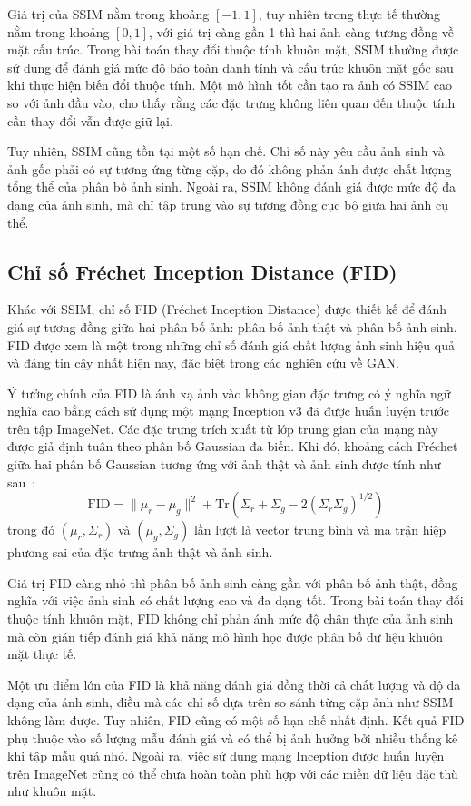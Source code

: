 \documentclass[../DoAn.tex]{subfiles}
\begin{document}
Giá trị của SSIM nằm trong khoảng $[-1, 1]$, tuy nhiên trong thực tế thường nằm trong khoảng $[0, 1]$, với giá trị càng gần 1 thì hai ảnh càng tương đồng về mặt cấu trúc. Trong bài toán thay đổi thuộc tính khuôn mặt, SSIM thường được sử dụng để đánh giá mức độ bảo toàn danh tính và cấu trúc khuôn mặt gốc sau khi thực hiện biến đổi thuộc tính. Một mô hình tốt cần tạo ra ảnh có SSIM cao so với ảnh đầu vào, cho thấy rằng các đặc trưng không liên quan đến thuộc tính cần thay đổi vẫn được giữ lại.

Tuy nhiên, SSIM cũng tồn tại một số hạn chế. Chỉ số này yêu cầu ảnh sinh và ảnh gốc phải có sự tương ứng từng cặp, do đó không phản ánh được chất lượng tổng thể của phân bố ảnh sinh. Ngoài ra, SSIM không đánh giá được mức độ đa dạng của ảnh sinh, mà chỉ tập trung vào sự tương đồng cục bộ giữa hai ảnh cụ thể.

\subsection{Chỉ số Fréchet Inception Distance (FID)}

Khác với SSIM, chỉ số FID (Fréchet Inception Distance) được thiết kế để đánh giá sự tương đồng giữa hai phân bố ảnh: phân bố ảnh thật và phân bố ảnh sinh. FID được xem là một trong những chỉ số đánh giá chất lượng ảnh sinh hiệu quả và đáng tin cậy nhất hiện nay, đặc biệt trong các nghiên cứu về GAN.

Ý tưởng chính của FID là ánh xạ ảnh vào không gian đặc trưng có ý nghĩa ngữ nghĩa cao bằng cách sử dụng một mạng Inception v3 đã được huấn luyện trước trên tập ImageNet. Các đặc trưng trích xuất từ lớp trung gian của mạng này được giả định tuân theo phân bố Gaussian đa biến. Khi đó, khoảng cách Fréchet giữa hai phân bố Gaussian tương ứng với ảnh thật và ảnh sinh được tính như sau~\cite{heusel2017fid}:
\[
\text{FID} = \|\mu_r - \mu_g\|^2 + \text{Tr}\left(\Sigma_r + \Sigma_g - 2(\Sigma_r \Sigma_g)^{1/2}\right)
\]
trong đó $(\mu_r, \Sigma_r)$ và $(\mu_g, \Sigma_g)$ lần lượt là vector trung bình và ma trận hiệp phương sai của đặc trưng ảnh thật và ảnh sinh.

Giá trị FID càng nhỏ thì phân bố ảnh sinh càng gần với phân bố ảnh thật, đồng nghĩa với việc ảnh sinh có chất lượng cao và đa dạng tốt. Trong bài toán thay đổi thuộc tính khuôn mặt, FID không chỉ phản ánh mức độ chân thực của ảnh sinh mà còn gián tiếp đánh giá khả năng mô hình học được phân bố dữ liệu khuôn mặt thực tế.

Một ưu điểm lớn của FID là khả năng đánh giá đồng thời cả chất lượng và độ đa dạng của ảnh sinh, điều mà các chỉ số dựa trên so sánh từng cặp ảnh như SSIM không làm được. Tuy nhiên, FID cũng có một số hạn chế nhất định. Kết quả FID phụ thuộc vào số lượng mẫu đánh giá và có thể bị ảnh hưởng bởi nhiễu thống kê khi tập mẫu quá nhỏ. Ngoài ra, việc sử dụng mạng Inception được huấn luyện trên ImageNet cũng có thể chưa hoàn toàn phù hợp với các miền dữ liệu đặc thù như khuôn mặt.
\end{document}
